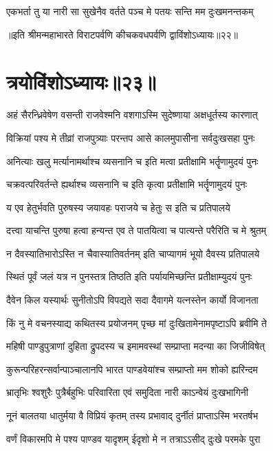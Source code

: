 \twolineshloka
{एकभर्ता तु या नारी सा सुखेनैव वर्तते}
{पञ्च मे पतयः सन्ति मम दुःखमनन्तकम्}

॥इति श्रीमन्महाभारते विराटपर्वणि कीचकवधपर्वणि द्वाविंशोऽध्यायः॥२२॥

\chapter{त्रयोविंशोऽध्यायः॥२३॥}


\twolineshloka
{अहं सैरन्ध्रिवेषेण वसन्ती राजवेश्मनि}
{वशगाऽस्मि सुदेष्णाया अक्षधूर्तस्य कारणात्}


\twolineshloka
{विक्रियां पश्य मे तीव्रां राजपुत्र्याः परन्तप}
{आसे कालमुपासीना सर्वदुःखसहा पुनः}


\twolineshloka
{अनित्याः खलु मर्त्यानामर्थाश्च व्यसनानि च}
{इति मत्वा प्रतीक्षामि भर्तॄणामुदयं पुनः}


\twolineshloka
{चक्रवत्परिवर्तन्ते ह्यर्थाश्च व्यसनानि च}
{इति कृत्वा प्रतीक्षामि भर्तॄणामुदयं पुनः}


\twolineshloka
{य एव हेतुर्भवति पुरुषस्य जयावहः}
{पराजये च हेतुः स इति च प्रतिपालये}


\twolineshloka
{दत्त्वा याचन्ति पुरुषा हत्वा हन्यन्त एव ते}
{पातयित्वा च पात्यन्ते परैरिति च मे श्रुतम्}


\twolineshloka
{न दैवस्यातिभारोऽस्ति न चैवास्यातिवर्तनम्}
{इति चाप्यागमं भूयो दैवस्य प्रतिपालये}


\twolineshloka
{स्थितं पूर्वं जलं यत्र न पुनस्तत्र तिष्ठति}
{इति पर्यायमिच्छन्ति प्रतीक्षाम्युदयं पुनः}


\twolineshloka
{दैवेन किल यस्यार्थः सुनीतोऽपि विपद्यते}
{सदा दैवागमे यत्नस्तेन कार्यो विजानता}


\twolineshloka
{किं नु मे वचनस्याद्य कथितस्य प्रयोजनम्}
{पृच्छ मां दुःखितामेनामपृष्टाऽपि ब्रवीमि ते}


\twolineshloka
{महिषी पाण्डुपुत्राणां दुहिता द्रुपदस्य च}
{इमामवस्थां सम्प्राप्ता मदन्या का जिजीविषेत्}


\twolineshloka
{कुरून्परिहरन्सर्वान्पाञ्चालानपि भारत}
{पाण्डवेयांश्च सम्प्राप्तो मम शोको ह्यरिन्दम}


\twolineshloka
{भ्रातृभिः श्वशुरैः पुत्रैर्बहुभिः परिवारिता}
{एवं समुदिता नारी काऽन्वेयं दुःखभागिनी}


\twolineshloka
{नूनं बालतया धातुर्मया वै विप्रियं कृतम्}
{तस्य प्रभावाद् दुर्नीतं प्राप्ताऽस्मि भरतर्षभ}


\twolineshloka
{वर्णं विकारमपि मे पश्य पाण्डव यादृशम्}
{ईदृशो मे न तत्राऽऽसीद् दुःखे परमके पुरा}


